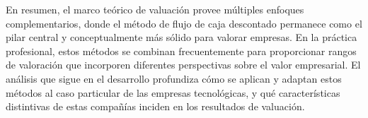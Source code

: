 En resumen, el marco teórico de valuación provee múltiples enfoques complementarios, donde el método de flujo de caja descontado permanece como el pilar central y conceptualmente más sólido para valorar empresas. En la práctica profesional, estos métodos se combinan frecuentemente para proporcionar rangos de valoración que incorporen diferentes perspectivas sobre el valor empresarial. El análisis que sigue en el desarrollo profundiza cómo se aplican y adaptan estos métodos al caso particular de las empresas tecnológicas, y qué características distintivas de estas compañías inciden en los resultados de valuación. 
